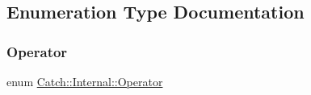 \subsection{Enumeration Type Documentation}
\mbox{\label{namespace_catch_1_1_internal_ae3f96598a7858155750bf38e7295d83e}} 
\subsubsection{\texorpdfstring{Operator}{Operator}}
{\footnotesize\ttfamily enum \mbox{\hyperlink{namespace_catch_1_1_internal_ae3f96598a7858155750bf38e7295d83e}{Catch\+::\+Internal\+::\+Operator}}}


